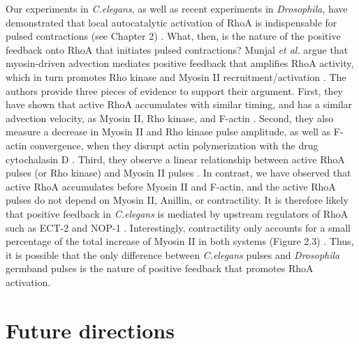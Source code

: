 \documentclass{ucetd}
\begin{document}
Our experiments in \textit{C.elegans}, as well as recent experiments in \textit{Drosophila}, have demonstrated that local autocatalytic activation of RhoA is indispensable for pulsed contractions (see Chapter 2) \cite{Munjal:2015bx}.  What, then, is the nature of the positive feedback onto RhoA that initiates pulsed contractions?   Munjal \textit{et al.} argue that myosin-driven advection mediates positive feedback that amplifies RhoA activity, which in turn promotes Rho kinase and Myosin II recruitment/activation \cite{Munjal:2015bx}.  The authors provide three pieces of evidence to support their argument.  First, they have shown that active RhoA accumulates with similar timing, and has a similar advection velocity, as Myosin II, Rho kinase, and F-actin \cite{Munjal:2015bx}.  Second, they also measure a decrease in Myosin II and Rho kinase pulse amplitude, as well as F-actin convergence, when they disrupt actin polymerization with the drug cytochalasin D \cite{Munjal:2015bx}.  Third, they observe a linear relationship between active RhoA pulses (or Rho kinase) and Myosin II pulses \cite{Munjal:2015bx}.  In contrast, we have observed that active RhoA accumulates before Myosin II and F-actin, and the active RhoA pulses do not depend on Myosin II, Anillin, or contractility.  It is therefore likely that positive feedback in \textit{C.elegans} is mediated by upstream regulators of RhoA such as ECT-2 and NOP-1 \cite{Tse:2012fp}.  Interestingly, contractility only accounts for a small percentage of the total increase of Myosin II in both systems (Figure 2.3) \cite{Munjal:2015bx}.  Thus, it is possible that the only difference between \textit{C.elegans} pulses and \textit{Drosophila} germband pulses is the nature of positive feedback that promotes RhoA activation.


\section{Future directions}	
\end{document}
